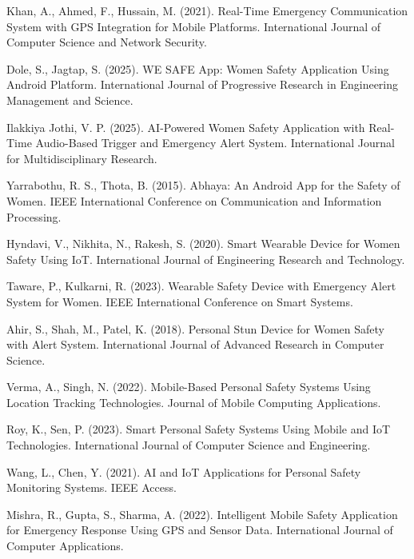 \documentclass[a4paper,12pt]{report}
\begin{document}
\begin{enumerate}[label={[\arabic*]}, leftmargin=1.5cm]
\item Khan, A., Ahmed, F., Hussain, M. (2021). Real-Time Emergency Communication System with GPS Integration for Mobile Platforms. International Journal of Computer Science and Network Security.

\item Dole, S., Jagtap, S. (2025). WE SAFE App: Women Safety Application Using Android Platform. International Journal of Progressive Research in Engineering Management and Science.

\item Ilakkiya Jothi, V. P. (2025). AI-Powered Women Safety Application with Real-Time Audio-Based Trigger and Emergency Alert System. International Journal for Multidisciplinary Research.

\item Yarrabothu, R. S., Thota, B. (2015). Abhaya: An Android App for the Safety of Women. IEEE International Conference on Communication and Information Processing.

\item Hyndavi, V., Nikhita, N., Rakesh, S. (2020). Smart Wearable Device for Women Safety Using IoT. International Journal of Engineering Research and Technology.

\item Taware, P., Kulkarni, R. (2023). Wearable Safety Device with Emergency Alert System for Women. IEEE International Conference on Smart Systems.

\item Ahir, S., Shah, M., Patel, K. (2018). Personal Stun Device for Women Safety with Alert System. International Journal of Advanced Research in Computer Science.

\item Verma, A., Singh, N. (2022). Mobile-Based Personal Safety Systems Using Location Tracking Technologies. Journal of Mobile Computing Applications.

\item Roy, K., Sen, P. (2023). Smart Personal Safety Systems Using Mobile and IoT Technologies. International Journal of Computer Science and Engineering.

\item Wang, L., Chen, Y. (2021). AI and IoT Applications for Personal Safety Monitoring Systems. IEEE Access.

\item Mishra, R., Gupta, S., Sharma, A. (2022). Intelligent Mobile Safety Application for Emergency Response Using GPS and Sensor Data. International Journal of Computer Applications.


\end{enumerate}
\end{document}
